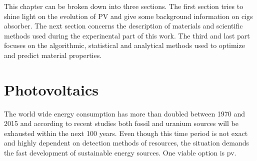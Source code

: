 
This chapter can be broken down into three sections. 
The first section tries to shine light on the evolution of PV and give some background information on \gls{cigs} absorber.
The next section concerns the description of materials and scientific methods used during the experinental part of this work. 
The third and last part focuses on the algorithmic, statistical and analytical methods used to optimize and predict material properties. 

\section{Photovoltaics}
The world wide energy consumption has more than doubled between 1970 and 2015\cite{BP2017} 
and according to recent studies both fossil\cite{BGR2017} and uranium sources\cite{Uran2006} 
will be exhausted within the next 100 years. 
Even though this time period is not exact and highly dependent on detection methods of resources, 
the situation demands the fast 
development of sustainable energy sources. 
One viable option is \gls{pv}.


